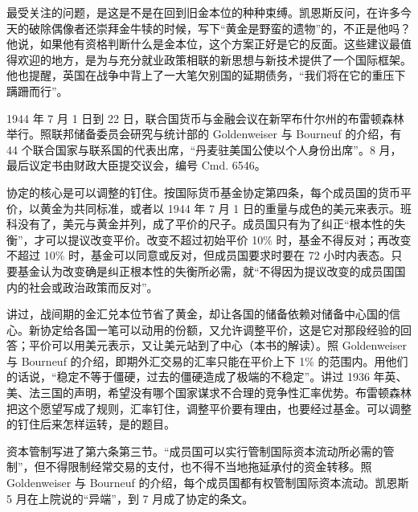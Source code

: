 最受关注的问题，是这是不是在回到旧金本位的种种束缚\cite{hansard1944}。凯恩斯反问，在许多今天的破除偶像者还崇拜金牛犊的时候，写下“黄金是野蛮的遗物”的，不正是他吗\cite{hansard1944}？他说，如果他有资格判断什么是金本位，这个方案正好是它的反面\cite{hansard1944}。这些建议最值得欢迎的地方，是为与充分就业政策相联的新思想与新技术提供了一个国际框架\cite{hansard1944}。他也提醒，英国在战争中背上了一大笔欠别国的延期债务，“我们将在它的重压下蹒跚而行”\cite{hansard1944}。

1944 年 7 月 1 日到 22 日，联合国货币与金融会议在新罕布什尔州的布雷顿森林举行\cite{bw1944}。照联邦储备委员会研究与统计部的 Goldenweiser 与 Bourneuf 的介绍，有 44 个联合国家与联系国的代表出席，“丹麦驻美国公使以个人身份出席”\cite{frb1944}。8 月，最后议定书由财政大臣提交议会，编号 Cmd. 6546\cite{bw1944}。

协定的核心是可以调整的钉住。按国际货币基金协定第四条，每个成员国的货币平价，以黄金为共同标准，或者以 1944 年 7 月 1 日的重量与成色的美元来表示\cite{bw1944}。班科没有了，美元与黄金并列，成了平价的尺子。成员国只有为了纠正“根本性的失衡”，才可以提议改变平价\cite{bw1944}。改变不超过初始平价 10\% 时，基金不得反对；再改变不超过 10\% 时，基金可以同意或反对，但成员国要求时要在 72 小时内表态\cite{bw1944}。只要基金认为改变确是纠正根本性的失衡所必需，就“不得因为提议改变的成员国国内的社会或政治政策而反对”\cite{bw1944}。

讲过，战间期的金汇兑本位节省了黄金，却让各国的储备依赖对储备中心国的信心。新协定给各国一笔可以动用的份额，又允许调整平价，这是它对那段经验的回答；平价可以用美元表示，又让美元站到了中心（本书的解读）。照 Goldenweiser 与 Bourneuf 的介绍，即期外汇交易的汇率只能在平价上下 1\% 的范围内\cite{frb1944}。用他们的话说，“稳定不等于僵硬，过去的僵硬造成了极端的不稳定”\cite{frb1944}。讲过 1936 年英、美、法三国的声明，希望没有哪个国家谋求不合理的竞争性汇率优势\cite{frb1936}。布雷顿森林把这个愿望写成了规则，汇率钉住，调整平价要有理由，也要经过基金。可以调整的钉住后来怎样运转，是的题目。

资本管制写进了第六条第三节。“成员国可以实行管制国际资本流动所必需的管制”，但不得限制经常交易的支付，也不得不当地拖延承付的资金转移\cite{bw1944}。照 Goldenweiser 与 Bourneuf 的介绍，每个成员国都有权管制国际资本流动\cite{frb1944}。凯恩斯 5 月在上院说的“异端”，到 7 月成了协定的条文。

